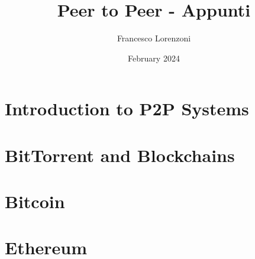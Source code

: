 

\title{Peer to Peer - Appunti}
\author{Francesco Lorenzoni}
\date{February 2024}



\maketitle
\tableofcontents

\part{Introduction to P2P Systems}
% 



\part{BitTorrent and Blockchains}



\part{Bitcoin}





\part{Ethereum}



% 






